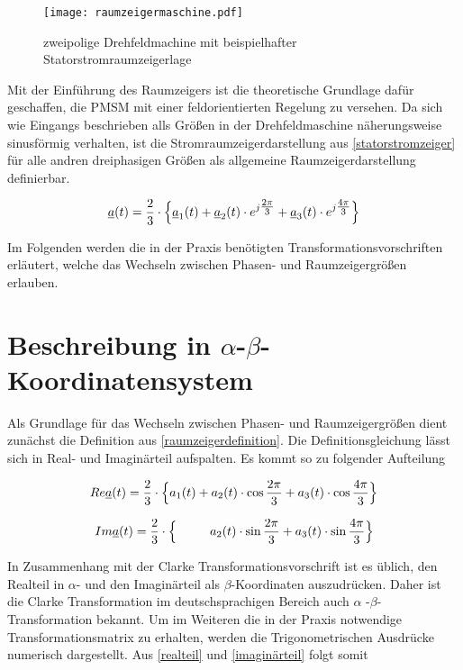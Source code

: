 \begin{figure}[h]
	\centering
	\texttt{[image: raumzeigermaschine.pdf]}
	\label{fig:raumzeigermaschine}
	\caption{zweipolige Drehfeldmachine mit beispielhafter Statorstromraumzeigerlage}
\end{figure}

Mit der Einführung des Raumzeigers ist die theoretische Grundlage dafür geschaffen, die PMSM mit einer feldorientierten Regelung zu versehen. 
Da sich wie Eingangs beschrieben alls Größen in der Drehfeldmaschine näherungsweise sinusförmig verhalten, ist die Stromraumzeigerdarstellung aus \ref{statorstromzeiger} für alle andren dreiphasigen Größen als allgemeine Raumzeigerdarstellung definierbar.

\begin{align}
	\underline{a}(t) = \frac{2}{3} \cdot \Bigl\{\underline{a}_{1}(t) + \underline{a}_{2}(t)\cdot e^{j\tfrac{2\pi}{3}} + \underline{a}_{3}(t)\cdot e^{j\tfrac{4\pi}{3}} \Bigr\} \label{raumzeigerdefinition}
\end{align}

Im Folgenden werden die in der Praxis benötigten Transformationsvorschriften erläutert, welche das Wechseln zwischen Phasen- und Raumzeigergrößen erlauben.


\section{Beschreibung in $\alpha$-$\beta$-Koordinatensystem}\label{sec:clark}

Als Grundlage für das Wechseln zwischen Phasen- und Raumzeigergrößen dient zunächst die Definition aus \ref{raumzeigerdefinition}. Die Definitionsgleichung lässt sich in Real- und Imaginärteil aufspalten. Es kommt so zu folgender Aufteilung

\begin{align}
	Re{\underline{a}(t)} = \frac{2}{3} \cdot \Bigl\{ a_{1}(t) + a_{2}(t) \cdot\cos{\frac{2 \pi}{3}} + a_{3}(t) \cdot\cos{\frac{4 \pi}{3}} \Bigr\}
	\label{realteil}
\end{align}

\begin{align}
	Im{\underline{a}(t)} = \frac{2}{3} \cdot \Bigl\{ ~~~~~~~~a_{2}(t)\cdot\sin{\frac{2 \pi}{3}} + a_{3}(t) \cdot\sin{\frac{4 \pi}{3}} \Bigr\}
	\label{imaginärteil}
\end{align}

In Zusammenhang mit der Clarke Transformationsvorschrift ist es üblich, den Realteil in $\alpha$- und den Imaginärteil als $\beta$-Koordinaten auszudrücken. 
Daher ist die Clarke Transformation im deutschsprachigen Bereich auch $\alpha$ -$\beta$-Transformation bekannt.
Um im Weiteren die in der Praxis notwendige Transformationsmatrix zu erhalten, werden die Trigonometrischen Ausdrücke numerisch dargestellt. 
Aus \ref{realteil} und \ref{imaginärteil} folgt somit

